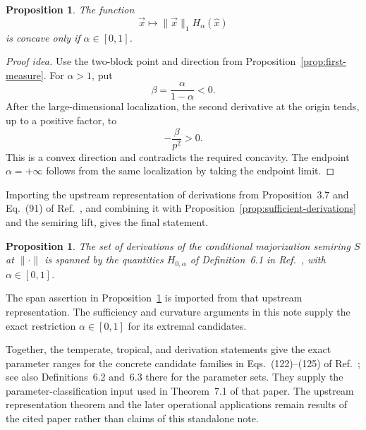 \documentclass[11pt]{article}
\newtheorem{proposition}[theorem]{Proposition}
\theoremstyle{definition}
\begin{document}
\begin{proposition}
\label{prop:measure-derivation}
The function
\begin{equation}
\vec{x}\longmapsto\|\vec{x}\|_1H_\alpha(\hat{x})
\end{equation}
is concave only if $\alpha\in[0,1]$.
\end{proposition}

\begin{proof}[Proof idea]
Use the two-block point and direction from Proposition~\ref{prop:first-measure}.
For $\alpha>1$, put
\begin{equation}
\beta=\frac{\alpha}{1-\alpha}<0.
\end{equation}
After the large-dimensional localization, the second derivative at the origin
tends, up to a positive factor, to
\begin{equation}
-\frac{\beta}{p^2}>0.
\end{equation}
This is a convex direction and contradicts the required concavity.  The endpoint
$\alpha=+\infty$ follows from the same localization by taking the endpoint limit.
\end{proof}

Importing the upstream representation of derivations from Proposition~3.7 and
Eq.~(91) of Ref.~\cite{rubboli2026complete}, and combining it with
Proposition~\ref{prop:sufficient-derivations} and the semiring lift, gives the
final statement.

\begin{proposition}
\label{prop:Derivations}
The set of derivations of the conditional majorization semiring $S$ at
$\|\cdot\|$ is spanned by the quantities $H_{0,\alpha}$ of Definition~6.1 in
Ref.~\cite{rubboli2026complete}, with $\alpha\in[0,1]$.
\end{proposition}

The span assertion in Proposition~\ref{prop:Derivations} is imported from that
upstream representation.  The sufficiency and curvature arguments in this note
supply the exact restriction $\alpha\in[0,1]$ for its extremal candidates.

Together, the temperate, tropical, and derivation statements give the exact
parameter ranges for the concrete candidate families in Eqs.~(122)--(125) of
Ref.~\cite{rubboli2026complete}; see also Definitions~6.2 and~6.3 there for the
parameter sets.  They supply the parameter-classification input used in
Theorem~7.1 of that paper.  The upstream representation theorem and the later
operational applications remain results of the cited paper rather than claims of
this standalone note.
\end{document}
